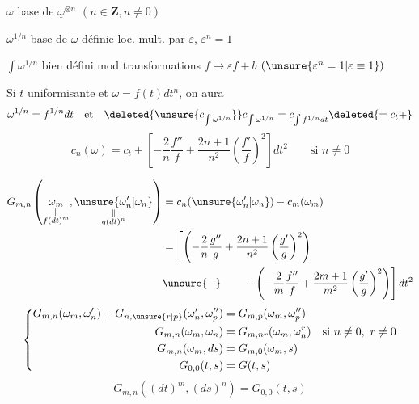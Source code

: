 $\omega$ base de $\underline\omega^{\otimes n}$ $(n\in\mathbf Z,n\ne0)$

$\omega^{1/n}$ base de $\underline\omega$ définie loc.  mult.
par $\varepsilon$, $\varepsilon^n=1$

$\int\omega^{1/n}$ bien défini mod transformations
$f\longmapsto\varepsilon f+b$ $(\unsure{\varepsilon^n=1|\varepsilon\equiv1})$

Si $t$ uniformisante et $\omega=f(t)dt^n$, on aura
\[
\omega^{1/n}=f^{1/n}dt\quad\text{et}\quad
\deleted{\unsure{c_{\int\omega^{1/n}}}}
c_{\int\omega^{1/n}}=c_{\int f^{1/n}dt}\deleted{=c_t+}
\]
\[
c_n(\omega)=c_t+\left[-\frac2n\frac{f''}{f}
+\frac{2n+1}{n^2}\left(\frac{f'}f\right)^2\right]dt^2
\qquad\text{si }n\ne0
\]

\[
\begin{aligned}
G_{m,n}\left(
\underset{\substack{\Vert\\f(dt)^m}}{\omega_m},
\underset{\substack{\Vert\\g(dt)^n}}{\unsure{\omega'_n|\omega_n}}\right)
&=c_n(\unsure{\omega'_n|\omega_n})-c_m(\omega_m)\\
&=\left[\left(-\frac2n\frac{g''}{g}
+\frac{2n+1}{n^2}\left(\frac{g'}g\right)^2\right)\right.\\
&\unsure{-}\qquad\left.-\left(-\frac2m\frac{f''}f
+\frac{2m+1}{m^2}\left(\frac{g'}g\right)^2\right)\right]dt^2
\end{aligned}
\]
\[
\left\{\begin{aligned}
G_{m,n}(\omega_m,\omega'_n)+G_{n,\unsure{r|p}}(\omega'_n,\omega''_p)
&=G_{m,p}(\omega_m,\omega''_p)\\
G_{m,n}(\omega_m,\omega_n)&=G_{m,nr}(\omega_m,\omega_n^r)
\quad\text{si }n\ne0,\ r\ne0\\
G_{m,n}(\omega_m,ds)&=G_{m,0}(\omega_m,s)\\
G_{0,0}(t,s)&=G(t,s)
\end{aligned}\right.
\]
\inserted{\[
G_{m,n}(\omega_m,(ds)^n)=G_{m,0}(\omega_m,s)
\]}
\[
G_{m,n}((dt)^m,(ds)^n)=G_{0,0}(t,s)
\]

